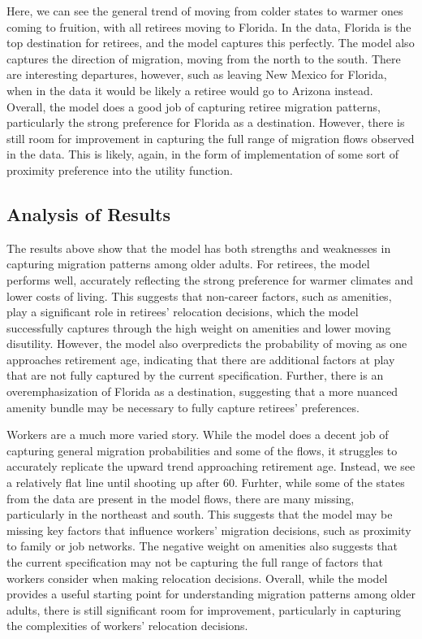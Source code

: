 \documentclass[11pt,a4paper]{article}
\begin{document}
Here, we can see the general trend of moving from colder states to warmer ones coming to fruition, with all retirees moving to Florida. In the data, Florida is the top destination for retirees, and the model captures this perfectly. The model also captures the direction of migration, moving from the north to the south. There are interesting departures, however, such as leaving New Mexico for Florida, when in the data it would be likely a retiree would go to Arizona instead. Overall, the model does a good job of capturing retiree migration patterns, particularly the strong preference for Florida as a destination. However, there is still room for improvement in capturing the full range of migration flows observed in the data. This is likely, again, in the form of implementation of some sort of proximity preference into the utility function.

\subsection{Analysis of Results}
\label{subsec:analysis}

The results above show that the model has both strengths and weaknesses in capturing migration patterns among older adults. For retirees, the model performs well, accurately reflecting the strong preference for warmer climates and lower costs of living. This suggests that non-career factors, such as amenities, play a significant role in retirees' relocation decisions, which the model successfully captures through the high weight on amenities and lower moving disutility. However, the model also overpredicts the probability of moving as one approaches retirement age, indicating that there are additional factors at play that are not fully captured by the current specification. Further, there is an overemphasization of Florida as a destination, suggesting that a more nuanced amenity bundle may be necessary to fully capture retirees' preferences.

Workers are a much more varied story. While the model does a decent job of capturing general migration probabilities and some of the flows, it struggles to accurately replicate the upward trend approaching retirement age. Instead, we see a relatively flat line until shooting up after 60. Furhter, while some of the states from the data are present in the model flows, there are many missing, particularly in the northeast and south. This suggests that the model may be missing key factors that influence workers' migration decisions, such as proximity to family or job networks. The negative weight on amenities also suggests that the current specification may not be capturing the full range of factors that workers consider when making relocation decisions. Overall, while the model provides a useful starting point for understanding migration patterns among older adults, there is still significant room for improvement, particularly in capturing the complexities of workers' relocation decisions.
\end{document}
